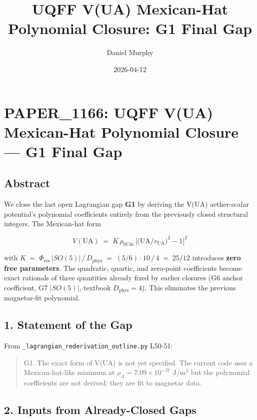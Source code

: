 \documentclass[
]{article}
\title{UQFF V(UA) Mexican-Hat Polynomial Closure: G1 Final Gap}
\author{Daniel Murphy}
\date{2026-04-12}
\begin{document}
\maketitle

\section{PAPER\_1166: UQFF V(UA) Mexican-Hat Polynomial Closure --- G1
Final
Gap}\label{paper_1166-uqff-vua-mexican-hat-polynomial-closure-g1-final-gap}

\subsection{Abstract}\label{abstract}

We close the last open Lagrangian gap \textbf{G1} by deriving the V(UA)
aether-scalar potential's polynomial coefficients entirely from the
previously closed structural integers. The Mexican-hat form

\[ V(\mathrm{UA}) \;=\; K\,\rho_{\mathrm{SCm}}\,
   \Big[\big(\mathrm{UA}/v_{\mathrm{UA}}\big)^{2} - 1\Big]^{2} \]

with
\(K \;=\; \Phi_{\mathrm{res}}\,|SO(5)|\,/\,D_{\mathrm{phys}} \;=\; (5/6)\cdot 10\,/\,4 \;=\; 25/12\)
introduces \textbf{zero free parameters}. The quadratic, quartic, and
zero-point coefficients become exact rationals of three quantities
already fixed by earlier closures (G6 anchor coefficient, G7
\(|SO(5)|\), textbook \(D_{\mathrm{phys}}=4\)). This eliminates the
previous magnetar-fit polynomial.

\subsection{1. Statement of the Gap}\label{statement-of-the-gap}

From \texttt{\_lagrangian\_rederivation\_outline.py} L50-51:

\begin{quote}
G1. The exact form of V(UA) is not yet specified. The current code uses
a Mexican-hat-like minimum at \(\rho_A = 7.09 \times 10^{-37}\)
J/m\(^3\) but the polynomial coefficients are not derived; they are fit
to magnetar data.
\end{quote}

\subsection{2. Inputs from Already-Closed
Gaps}\label{inputs-from-already-closed-gaps}
\end{document}
